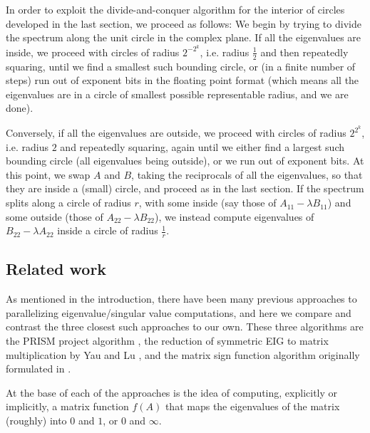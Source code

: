 \documentclass{article}
\theoremstyle{definition}
\begin{document}
In order to exploit the divide-and-conquer algorithm for the interior of circles developed in the last section, we proceed as follows: We begin by trying to divide the spectrum along the unit circle in the complex plane. If all the eigenvalues are inside, we proceed with circles of radius $2^{-2^k}$, i.e. radius $\frac{1}{2}$ and then repeatedly squaring, until we find a smallest such bounding  circle, or (in a finite number of steps) run out of exponent bits in the floating point format (which means all the eigenvalues are in a circle of smallest possible representable radius, and we are done).

Conversely, if all the eigenvalues are outside, we proceed with  circles of radius $2^{2^k}$, i.e. radius $2$ and repeatedly squaring, again until we either find a largest such bounding circle (all eigenvalues being outside), or we run out of exponent bits. At this point, we swap $A$ and $B$, taking the reciprocals of all the eigenvalues, so that they are inside a (small) circle, and proceed as in the last section. If the spectrum splits along a circle of radius $r$, with some inside (say those of $A_{11} - \lambda B_{11}$)  and some outside (those of $A_{22} - \lambda B_{22}$),  we instead compute eigenvalues of $B_{22} - \lambda A_{22}$ inside a circle of radius $\frac{1}{r}$.

\subsection{Related work}


As mentioned in the introduction, there have been many previous approaches to parallelizing eigenvalue/singular value computations, and here we compare and contrast the three closest such approaches to our own.  These three algorithms are the PRISM project algorithm \cite{bischofledermansuntsao}, the reduction of symmetric EIG to matrix multiplication by Yau and Lu \cite{luyau}, and the matrix sign function algorithm originally formulated in \cite{godunov86,bulgakov88,malyshev89,malyshev92,malyshev93}.

At the base of each of the approaches is the idea of computing, explicitly or implicitly, a matrix function $f(A)$  that maps the eigenvalues of the matrix (roughly) into $0$ and $1$, or $0$ and $\infty$.
\end{document}
